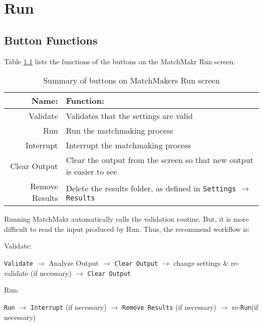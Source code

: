 \renewcommand{\pb}[1]{\parbox[t]{0.3\textwidth}{#1}}
\renewcommand{\tabline}[3]{#1 & #2 & #3\\ \hline}
\renewcommand{\multientry}[2]{& #1  & #2 \\ \cline{2-3} }
\renewcommand{\multiending}[2]{& #1 & #2  \\ \hline}

\chapter{Run}

\section{Button Functions}
Table \ref{tab:runbuttons} lists the functions of the buttons on the MatchMakr Run screen.

\begin{table}[h!]
	\centering
	\begin{tabular}{| r | l|}
		\hline
		\textbf{Name:} & \textbf{Function:} \\ \hline \hline
		
		Validate & Validates that the settings are valid \\ \hline
		Run & Run the matchmaking process \\ \hline
		Interrupt & Interrupt the matchmaking process \\ \hline
		Clear Output & Clear the output from the screen so that new output is easier to see \\ \hline
		Remove Results & Delete the results folder, as defined in \texttt{Settings} $\rightarrow$ 
							\texttt{Results} \\ \hline
		
	\end{tabular}
	\caption{\label{tab:runbuttons} Summary of buttons on MatchMakers Run screen}
\end{table}

Running MatchMakr automatically calls the validation routine.  But, it is more difficult to read the input produced by Run.  Thus, the recommend workflow is:

Validate: \par
\texttt{Validate} $\rightarrow$ Analyze Output $\rightarrow$ \texttt{Clear Output} $\rightarrow$ change settings \& re-validate (if necessary) $\rightarrow$ \texttt{Clear Output}

Run: \par
\texttt{Run} $\rightarrow$ \texttt{Interrupt} (if necessary) $\rightarrow$ \texttt{Remove Results} (if necessary) $\rightarrow$ re-\texttt{Run}(if necessary) 


